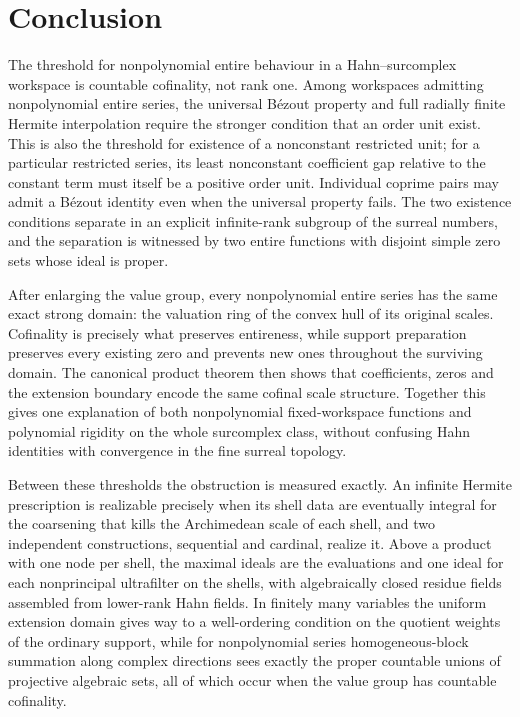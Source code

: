 \documentclass[11pt]{article}
\theoremstyle{plain}
\theoremstyle{plain}
\theoremstyle{plain}
\theoremstyle{definition}
\theoremstyle{definition}
\theoremstyle{definition}
\theoremstyle{definition}
\theoremstyle{remark}
\begin{document}
\section{Conclusion}
\label{ent:sec:conclusion}
The threshold for nonpolynomial entire behaviour in a Hahn--surcomplex
workspace is countable cofinality, not rank one. Among workspaces admitting
nonpolynomial entire series, the universal B\'ezout property and full
radially finite Hermite interpolation require the stronger condition that an
order unit exist. This is also the threshold for existence of a nonconstant
restricted unit; for a particular restricted series, its least nonconstant
coefficient gap relative to the constant term must itself be a positive
order unit. Individual coprime pairs may admit a B\'ezout identity even
when the universal property fails. The two existence conditions
separate in an explicit infinite-rank subgroup of the surreal numbers, and
the separation is witnessed by two entire functions with disjoint simple zero
sets whose ideal is proper.

After enlarging the value group, every nonpolynomial entire series has the
same exact strong domain: the valuation ring of the convex hull of its
original scales. Cofinality is precisely what preserves entireness, while
support preparation preserves every existing zero and prevents new ones
throughout the surviving domain. The canonical product theorem then shows
that coefficients, zeros and the extension boundary encode the same cofinal
scale structure. Together this gives one explanation of both nonpolynomial
fixed-workspace functions and polynomial rigidity on the whole surcomplex
class, without confusing Hahn identities with convergence in the fine surreal
topology.

Between these thresholds the obstruction is measured exactly. An infinite
Hermite prescription is realizable precisely when its shell data are
eventually integral for the coarsening that kills the Archimedean scale of
each shell, and two independent constructions, sequential and cardinal,
realize it. Above a product with one node per shell, the maximal ideals are
the evaluations and one ideal for each nonprincipal ultrafilter on the shells,
with algebraically closed residue fields assembled from lower-rank Hahn
fields. In finitely many variables the uniform extension domain gives way to
a well-ordering condition on the quotient weights of the ordinary support,
while for nonpolynomial series homogeneous-block summation along complex
directions sees exactly the proper countable unions of projective algebraic
sets, all of which occur when the value group has countable cofinality.
\end{document}
